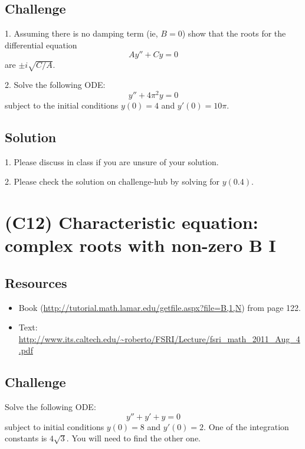 \subsection*{Challenge}
1. Assuming there is no damping term (ie, $B=0$) show that the roots for the differential equation
\begin{equation}
    A y'' + Cy = 0
\end{equation}
are $\pm i \sqrt{C/A}$.

2. Solve the following ODE:
\begin{equation}
    \label{eq:cecr}
    y'' + 4 \pi^2 y = 0
\end{equation}
subject to the initial conditions $y(0)=4$ and $y'(0)=10 \pi$.

\subsection*{Solution}
1. Please discuss in class if you are unsure of your solution.

2. Please check the solution on challenge-hub by solving for $y(0.4)$. %




\newpage
\section{(C12) Characteristic equation: complex roots with non-zero B I}

\subsection*{Resources}
\begin{itemize}
    \item Book (\url{http://tutorial.math.lamar.edu/getfile.aspx?file=B,1,N}) from page 122.
    \item Text: \url{http://www.its.caltech.edu/~roberto/FSRI/Lecture/fsri_math_2011_Aug_4.pdf}
\end{itemize}

\subsection*{Challenge}
Solve the following ODE:
\begin{equation}
    y'' + y' + y = 0
\end{equation}
subject to initial conditions $y(0)=8$ and $y'(0)=2$. One of the integration constants is $4 \sqrt{3}$. You will need to find the other one.

